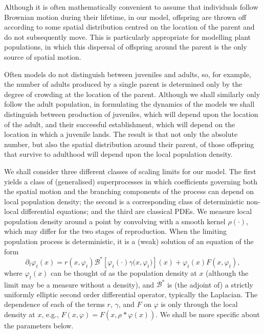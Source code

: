 \documentclass[12pt]{article}
\newcommand{\DG}{\mathcal{B}}  %
\newcommand{\kernel}{\rho}  %
\newcommand{\smooth}[1]{\kernel_{#1} \! * \!}  %
\numberwithin{equation}{section}
\begin{document}
Although it is often mathematically convenient to assume that individuals follow
Brownian motion during their lifetime, 
in our model, offspring are thrown off according to some 
spatial distribution centred on the location of the parent
and do not subsequently move.
This is particularly appropriate for modelling plant populations, in which
this dispersal of offspring around the parent is the only source of
spatial motion.

Often models do not distinguish between juveniles and adults, so,
for example, the number of adults produced by a single parent is determined only
by the degree of crowding at the location of the parent.
Although we shall similarly only follow the adult population, in formulating the dynamics of the
models we shall distinguish
between production of juveniles, which will depend upon the location of 
the adult, and their successful establishment, which will depend on the
location in which a juvenile lands. The result is that not only the absolute 
number, but also the spatial distribution
around their parent, 
of those offspring that survive to adulthood
will depend upon the local population 
density. 

We shall consider three different classes of scaling limits for our model.
The first yields a class of (generalised) superprocesses in which coefficients 
governing both the spatial motion and the branching components of the process can depend
on local population density; the second is a corresponding class of deterministic
non-local differential equations; and the third are classical PDEs.
We measure local population density around a point by convolving with
a smooth kernel $\rho(\cdot)$, which may differ
for the two stages of reproduction. 
When the limiting population process is deterministic,
it is a (weak) solution of an equation of the form
\begin{equation}
	\label{general deterministic limit}
        \partial_t \varphi_t(x)
        =
        r\left(x, \varphi_t \right)
        \DG^* \left[
            \varphi_t(\cdot)
            \gamma\big( x, \varphi_t \big)
        \right](x)
        +
        \varphi_t(x)
        F\left(x, \varphi_t \right)
        ,
\end{equation}
where
$\varphi_t(x)$ can be thought of as the population density at $x$
(although the limit may be a measure without a density), and
$\DG^*$ is (the adjoint of) a strictly uniformly elliptic second order differential operator, typically the Laplacian.
The dependence of each of the terms $r$, $\gamma$, and $F$ on $\varphi$ is only through the local density at $x$,
e.g., $F(x, \varphi) = F(x, \smooth{} \varphi(x))$.
We shall be more specific about the parameters below. 
\end{document}

